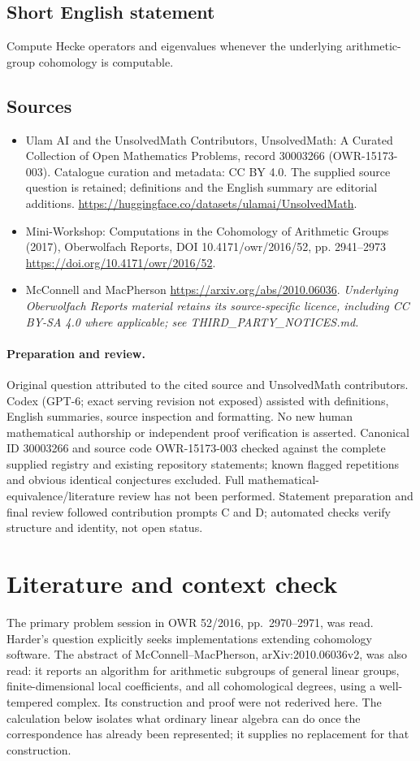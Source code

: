 \documentclass[11pt]{article}
\begin{document}
\subsection{Short English statement}
Compute Hecke operators and eigenvalues whenever the underlying arithmetic-group cohomology is computable.
\subsection{Sources}
\begin{itemize}
\item[S1] Ulam AI and the UnsolvedMath Contributors, UnsolvedMath: A Curated Collection of Open Mathematics Problems, record 30003266 (OWR-15173-003). Catalogue curation and metadata: CC BY 4.0. The supplied source question is retained; definitions and the English summary are editorial additions.
\url{https://huggingface.co/datasets/ulamai/UnsolvedMath}.
\item[S2] Mini-Workshop: Computations in the Cohomology of Arithmetic Groups (2017), Oberwolfach Reports, DOI 10.4171/owr/2016/52, pp. 2941--2973
\url{https://doi.org/10.4171/owr/2016/52}.
\item[S3] McConnell and MacPherson
\url{https://arxiv.org/abs/2010.06036}.
\textit{Underlying Oberwolfach Reports material retains its source-specific licence, including CC BY-SA 4.0 where applicable; see THIRD\_PARTY\_NOTICES.md.}
\end{itemize}
\paragraph{Preparation and review.}
Original question attributed to the cited source and UnsolvedMath contributors. Codex (GPT-6; exact serving revision not exposed) assisted with definitions, English summaries, source inspection and formatting. No new human mathematical authorship or independent proof verification is asserted. Canonical ID 30003266 and source code OWR-15173-003 checked against the complete supplied registry and existing repository statements; known flagged repetitions and obvious identical conjectures excluded. Full mathematical-equivalence/literature review has not been performed. Statement preparation and final review followed contribution prompts C and D; automated checks verify structure and identity, not open status.
\label{end:30003266}

\section{Literature and context check}
The primary problem session in OWR 52/2016, pp.~2970--2971, was read. Harder's question explicitly seeks implementations extending cohomology software. The abstract of McConnell--MacPherson, arXiv:2010.06036v2, was also read: it reports an algorithm for arithmetic subgroups of general linear groups, finite-dimensional local coefficients, and all cohomological degrees, using a well-tempered complex. Its construction and proof were not rederived here. The calculation below isolates what ordinary linear algebra can do once the correspondence has already been represented; it supplies no replacement for that construction.
\end{document}
